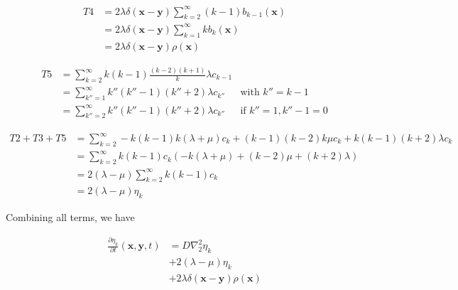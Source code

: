 \begin{subequations}

\begin{align}
T4 & =2\lambda\delta(\boldsymbol{x}-\boldsymbol{y})\sum_{k=2}^{\infty}(k-1)b_{k-1}(\boldsymbol{x})\label{la-2}\\
 & =2\lambda\delta(\boldsymbol{x}-\boldsymbol{y})\sum_{k=1}^{\infty}kb_{k}(\boldsymbol{x})\\
 & =2\lambda\delta(\boldsymbol{x}-\boldsymbol{y})\rho(\boldsymbol{x})
\end{align}

\end{subequations}

\begin{subequations}

\begin{align}
T5 & =\sum_{k=2}^{\infty}k(k-1)\frac{(k-2)(k+1)}{k}\lambda c_{k-1}\label{la-1}\\
 & =\sum_{k''=1}^{\infty}k''(k''-1)(k''+2)\lambda c_{k''} & \text{with }k''=k-1\\
 & =\sum_{k''=2}^{\infty}k''(k''-1)(k''+2)\lambda c_{k''} & \text{if }k''=1,k''-1=0
\end{align}

\end{subequations}

\begin{subequations}

\begin{align}
T2+T3+T5 & =\sum_{k=2}^{\infty}-k(k-1)k(\lambda+\mu)c_{k}+(k-1)(k-2)k\mu c_{k}+k(k-1)(k+2)\lambda c_{k}\label{la-1-1}\\
 & =\sum_{k=2}^{\infty}k(k-1)c_{k}(-k(\lambda+\mu)+(k-2)\mu+(k+2)\lambda)\\
 & =2(\lambda-\mu)\sum_{k=2}^{\infty}k(k-1)c_{k}\\
 & =2(\lambda-\mu)\eta_{k}
\end{align}

\end{subequations}

Combining all terms, we have

\begin{subequations} 
\begin{align}
\frac{\partial\eta_{k}}{\partial t}(\boldsymbol{x},\boldsymbol{y},t) & =D\nabla_{2}^{2}\eta_{k} \label{nk_diffusion-1}\\
 & +2(\lambda-\mu)\eta_{k} \label{nk_same_state-1}\\
 & +2\lambda\delta(\boldsymbol{x}-\boldsymbol{y})\rho(\boldsymbol{x}) \label{nk_death-1}
\end{align}
\end{subequations}

